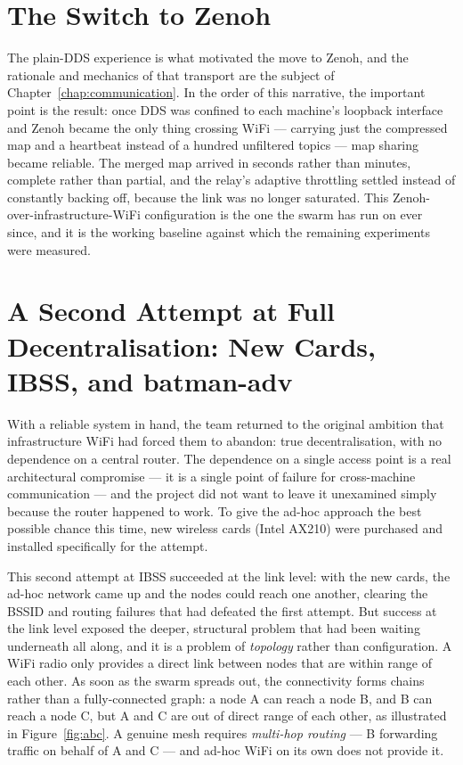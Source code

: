 \section{The Switch to Zenoh}
\label{sec:zenoh_switch}

The plain-DDS experience is what motivated the move to Zenoh, and the rationale and mechanics of that transport are the subject of Chapter~\ref{chap:communication}. In the order of this narrative, the important point is the result: once DDS was confined to each machine's loopback interface and Zenoh became the only thing crossing WiFi --- carrying just the compressed map and a heartbeat instead of a hundred unfiltered topics --- map sharing became reliable. The merged map arrived in seconds rather than minutes, complete rather than partial, and the relay's adaptive throttling settled instead of constantly backing off, because the link was no longer saturated. This Zenoh-over-infrastructure-WiFi configuration is the one the swarm has run on ever since, and it is the working baseline against which the remaining experiments were measured.

\section{A Second Attempt at Full Decentralisation: New Cards, IBSS, and batman-adv}
\label{sec:batman}

With a reliable system in hand, the team returned to the original ambition that infrastructure WiFi had forced them to abandon: true decentralisation, with no dependence on a central router. The dependence on a single access point is a real architectural compromise --- it is a single point of failure for cross-machine communication --- and the project did not want to leave it unexamined simply because the router happened to work. To give the ad-hoc approach the best possible chance this time, new wireless cards (Intel AX210) were purchased and installed specifically for the attempt.

This second attempt at IBSS succeeded at the link level: with the new cards, the ad-hoc network came up and the nodes could reach one another, clearing the BSSID and routing failures that had defeated the first attempt. But success at the link level exposed the deeper, structural problem that had been waiting underneath all along, and it is a problem of \emph{topology} rather than configuration. A WiFi radio only provides a direct link between nodes that are within range of each other. As soon as the swarm spreads out, the connectivity forms chains rather than a fully-connected graph: a node A can reach a node B, and B can reach a node C, but A and C are out of direct range of each other, as illustrated in Figure~\ref{fig:abc}. A genuine mesh requires \emph{multi-hop routing} --- B forwarding traffic on behalf of A and C --- and ad-hoc WiFi on its own does not provide it.

